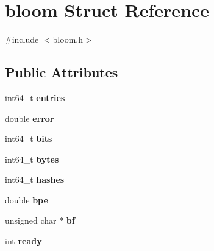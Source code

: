 \hypertarget{structbloom}{\section{bloom \-Struct \-Reference}
\label{structbloom}
}


{\ttfamily \#include $<$bloom.\-h$>$}

\subsection*{\-Public \-Attributes}
\begin{DoxyCompactItemize}
\item 
\hypertarget{structbloom_af34ec76e3ba09022fd1913b4833ee4c1}{int64\-\_\-t {\bfseries entries}}\label{structbloom_af34ec76e3ba09022fd1913b4833ee4c1}

\item 
\hypertarget{structbloom_ad7cff70c6a4302293766a9f2aa05dbf5}{double {\bfseries error}}\label{structbloom_ad7cff70c6a4302293766a9f2aa05dbf5}

\item 
\hypertarget{structbloom_a6413c66a5fcffdd2536bfed4d98f9dca}{int64\-\_\-t {\bfseries bits}}\label{structbloom_a6413c66a5fcffdd2536bfed4d98f9dca}

\item 
\hypertarget{structbloom_afa896350a8c443146055343b696e80fd}{int64\-\_\-t {\bfseries bytes}}\label{structbloom_afa896350a8c443146055343b696e80fd}

\item 
\hypertarget{structbloom_a97430268d53f065de7a87d09d485e453}{int64\-\_\-t {\bfseries hashes}}\label{structbloom_a97430268d53f065de7a87d09d485e453}

\item 
\hypertarget{structbloom_a212595fc7f12e2c96c8ac6339687f3bb}{double {\bfseries bpe}}\label{structbloom_a212595fc7f12e2c96c8ac6339687f3bb}

\item 
\hypertarget{structbloom_a02b6e4170af334c659560b1c9b72358e}{unsigned char $\ast$ {\bfseries bf}}\label{structbloom_a02b6e4170af334c659560b1c9b72358e}

\item 
\hypertarget{structbloom_aeeede825a5cc49347a5532445509035f}{int {\bfseries ready}}\label{structbloom_aeeede825a5cc49347a5532445509035f}

\end{DoxyCompactItemize}


